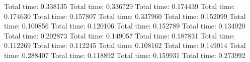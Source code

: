 Total time:   0.338135
Total time:   0.336729
Total time:   0.174439
Total time:   0.174630
Total time:   0.157807
Total time:   0.337960
Total time:   0.152099
Total time:   0.100856
Total time:   0.120106
Total time:   0.152789
Total time:   0.134920
Total time:   0.202873
Total time:   0.149057
Total time:   0.187831
Total time:   0.112269
Total time:   0.112245
Total time:   0.108162
Total time:   0.149014
Total time:   0.288407
Total time:   0.118892
Total time:   0.159931
Total time:   0.273992
